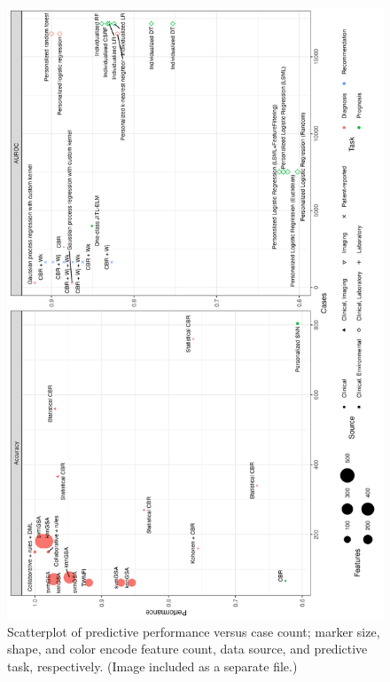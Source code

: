 \documentclass[sn-mathphys,Numbered,pdflatex]{sn-jnl}
\theoremstyle{remark}
\theoremstyle{definition}
\newcommand{\hl}[1]{#1}
\begin{document}
\begin{figure}[H]

{\centering \includegraphics[width=1\linewidth]{Fig6} 

}

\caption{\hl{Scatterplot of predictive performance versus case count;
 marker size, shape, and color
 encode feature count, data source, and predictive task, respectively.
 (Image included as a separate file.)}}\label{fig:performance}
\end{figure}

\renewcommand\refname{References}

\end{document}
